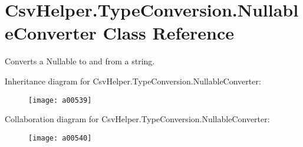 \hypertarget{a00132}{\section{Csv\-Helper.\-Type\-Conversion.\-Nullable\-Converter Class Reference}
\label{a00132}
}


Converts a Nullable to and from a string.  




Inheritance diagram for Csv\-Helper.\-Type\-Conversion.\-Nullable\-Converter\-:
\nopagebreak
\begin{figure}[H]
\begin{center}
\leavevmode
\texttt{[image: a00539]}
\end{center}
\end{figure}


Collaboration diagram for Csv\-Helper.\-Type\-Conversion.\-Nullable\-Converter\-:
\nopagebreak
\begin{figure}[H]
\begin{center}
\leavevmode
\texttt{[image: a00540]}
\end{center}
\end{figure}
